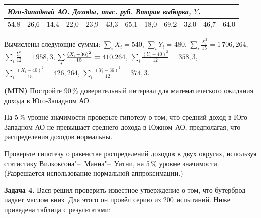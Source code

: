 \documentclass[12pt, a4paper]{article}\usepackage[]{graphicx}\usepackage[]{color}
\newenvironment{enumerate*}{
\begin{enumerate}
  \setlength{\itemsep}{0pt}
  \setlength{\parskip}{0pt}
  \setlength{\parsep}{0pt}
}{\end{enumerate}}
\newcommand{\MIN}{\textbf{(MIN)}{}}
\begin{document}
\begin{tabular}{|p{6mm}|p{6mm}|p{6mm}|p{6mm}|p{6mm}|p{6mm}|p{6mm}|p{6mm}|p{6mm}|p{6mm}|p{6mm}|p{6mm}|}
\multicolumn{12}{l}{\emph{Юго-Западный АО. Доходы, тыс. руб. Вторая выборка, $Y$.}}\\ \hline
54{,}8 & 26{,}6 & 14{,}4 & 22{,}0 & 23{,}9 & 43{,}3 & 65{,}1 & 18{,}0 & 69{,}2 & 32{,}0 & 46{,}7 & 64{,}0 \\ \hline
\end{tabular}\par\smallskip

Вычислены следующие суммы: $\sum\limits_i X_i=540$, $\sum\limits_i Y_i=480$, $\sum\limits_i \frac{X_i^2}{15}=1\,706{,}264$, $\sum\limits_i \frac{Y_i^2}{12}=1\,958{,}3$, $\sum\limits_i \frac{(X_i-36)^2}{15}\hm=410{,}264$, $\sum\limits_i \frac{(Y_i-40)^2}{12}=358{,}3$, $\sum\limits_i \frac{(X_i-40)^2}{15}=426{,}264$, $\sum\limits_i \frac{(Y_i-36)^2}{12}=374{,}3$.
\begin{enumerate*}
\item \MIN{} Постройте 90\,\% доверительный интервал для математического ожидания дохода в Юго-Западном АО.
\item На 5\,\% уровне значимости проверьте гипотезу о том, что средний доход в Юго-Западном АО не превышает среднего дохода в Южном АО, предполагая, что распределения доходов нормальны.
\item Проверьте гипотезу о равенстве распределений доходов в двух округах, используя статистику Вилкоксона"--~Манна"--~Уитни, на 5\,\% уровне значимости. (Разрешается использование нормальной аппроксимации.)
\end{enumerate*}

\textbf{Задача 4.} Вася решил проверить известное утверждение о том, что бутерброд падает маслом вниз. Для этого он провёл серию из 200 испытаний. Ниже приведена таблица с результатами:
\end{document}
